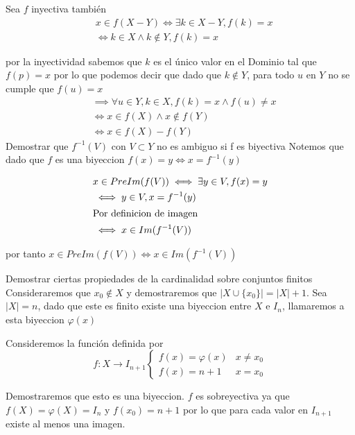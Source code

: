 \documentclass{homework}
\begin{document}
\parte
Sea \(f\) inyectiva también
\begin{align*}
    &x \in f(X - Y) \iff \exists k \in X - Y, f(k) = x\\
    &\iff k \in X \land k \notin Y, f(k) = x
\end{align*}

por la inyectividad sabemos que \(k\) es el único valor en el Dominio
tal que \(f(p) = x\) por lo que podemos decir que dado
que \(k \notin Y\), para todo \(u\) en \(Y\) no se cumple que \(f(u) = x\)
\begin{align*}
    &\implies \forall u \in Y, k \in X, f(k) = x \land f(u) \neq x\\
    &\iff x \in f(X) \land x \notin f(Y)\\
    &\iff x \in f(X) - f(Y)
\end{align*}
\question Demostrar que \(f^{-1}(V)\) con \(V \subset Y\) no es ambiguo si f es biyectiva
\label{sec:orgb90e391}
\parte
Notemos que dado que \(f\) es una biyeccion \(f(x) = y \iff x = f^{-1}(y)\)

\begin{align*}
    & x \in PreIm(f(V)) \iff \exists y \in V, f(x) = y\\
    & \iff y \in V, x = f^{-1}(y)\\
    \intertext{Por definicion de imagen}
    & \iff x \in Im(f^{-1}(V))
\end{align*}

por tanto \(x \in PreIm(f(V)) \iff x \in Im(f^{-1}(V))\)

\question Demostrar ciertas propiedades de la cardinalidad sobre conjuntos finitos
\label{sec:org20334e1}
\parte
Consideraremos que \(x_0 \notin X\) y demostraremos que \(|X \cup \{x_0\}| = |X| + 1\).
Sea \(|X| = n\), dado que este es finito existe una biyeccion entre
\(X\) e \(I_n\), llamaremos a esta biyeccion \(\varphi(x)\)

Consideremos la función definida por
\begin{equation*}
    f : X \to I_{n+1}
    \begin{cases}
        f(x) = \varphi(x) & x \neq x_0\\
        f(x) = n + 1 & x = x_0
    \end{cases}
\end{equation*}

Demostraremos que esto es una biyeccion.
\(f\) es sobreyectiva ya que \(f(X) = \varphi(X) = I_n\) y \(f(x_0) = n + 1\)
por lo que para cada valor en \(I_{n+1}\) existe al menos una imagen.
\end{document}
